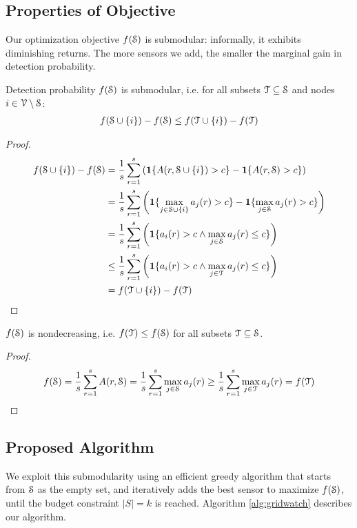\subsection{Properties of Objective}
Our optimization objective $f(\S)$ is submodular: informally, it exhibits diminishing returns. The more sensors we add, the smaller the marginal gain in detection probability.
\begin{theorem}
Detection probability $f(\S)$ is submodular, i.e. for all subsets $\T \subseteq \S$ and nodes $i \in \V \setminus \S$:
\begin{align}
f(\S \cup \{i\}) - f(\S) \le f(\T \cup \{i\}) - f(\T)
\end{align}
\end{theorem}
\begin{proof}
\begin{align*}
f(\S \cup \{i\}) - f(\S) &= \frac{1}{s} \sum_{r=1}^s \left( \mathbf{1}\{A(r, \S \cup \{i\})>c\} - \mathbf{1}\{A(r, \S)>c\} \right) \\
&= \frac{1}{s} \sum_{r=1}^s \left( \mathbf{1}\{ \max_{j \in \S \cup \{i\}} a_j(r) > c \} - \mathbf{1}\{ \max_{j \in \S} a_j(r) > c\} \right)\\
&= \frac{1}{s} \sum_{r=1}^s \left( \mathbf{1}\{ a_i(r) > c \wedge \max_{j \in \S} a_j(r) \le c \} \right)\\
&\le \frac{1}{s} \sum_{r=1}^s \left( \mathbf{1}\{ a_i(r) > c \wedge \max_{j \in \T} a_j(r) \le c \} \right)\\
&= f(\T \cup \{i\}) - f(\T)
\end{align*}
\end{proof}

\begin{theorem}
$f(\S)$ is nondecreasing, i.e. $f(\T) \le f(\S)$ for all subsets $\T \subseteq \S$.
\end{theorem}
\begin{proof}
\begin{align*}
f(\S) = \frac{1}{s} \sum_{r=1}^s A(r, \S) = \frac{1}{s} \sum_{r=1}^s \max_{j \in \S} a_j(r) \ge \frac{1}{s} \sum_{r=1}^s \max_{j \in \T} a_j(r) = f(\T)
\end{align*}
\end{proof}

\subsection{Proposed \method Algorithm}

We exploit this submodularity using an efficient greedy algorithm that starts from $\S$ as the empty set, and iteratively adds the best sensor to maximize $f(\S)$, until the budget constraint $|S|=k$ is reached. Algorithm \ref{alg:gridwatch} describes our \method algorithm.

